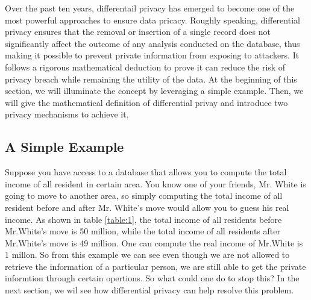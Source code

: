 \documentclass[a4paper, 11pt]{article} %
\begin{document}
Over the past ten years, differentail privacy\cite{dwork2008differential, dwork2014algorithmic} has emerged to become one of the most powerful approaches to ensure data pricacy. Roughly speaking, differential privacy ensures that the removal or insertion of a single record does not significantly affect the outcome of any analysis conducted on the database, thus making it possible to prevent private information from exposing to attackers. It follows a rigorous mathematical deduction to prove it can reduce the risk of privacy breach while remaining the utility of the data. At the beginning of this section, we will illuminate the concept by leveraging a simple example. Then, we will give the mathematical definition of differential privay and introduce two privacy mechanisms to achieve it.

\subsection{A Simple Example}
Suppose you have access to a database that allows you to compute the total income of all resident in certain area. You know one of your friends, Mr. White is going to move to another area, so simply computing the total income of all resident before and after Mr. White's move would allow you to guess his real income. As shown in table \ref{table:1}, the total income of all residents before Mr.White's move is 50 million, while the total income of all residents after Mr.White's move is 49 million. One can compute the real income of Mr.White is 1 millon. So from this example we can see even though we are not allowed to retrieve the information of a particular person, we are still able to get the private informtion through certain opertions. So what could one do to stop this? In the next section, we wil see how differential privacy can help resolve this problem.
\end{document}

